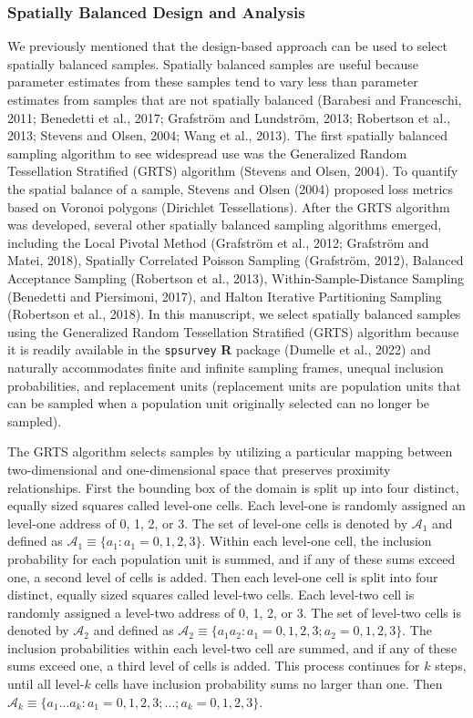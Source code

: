 \documentclass[]{elsarticle} %
\begin{document}
\hypertarget{subsec:spb_design}{%
\subsubsection{Spatially Balanced Design and
Analysis}\label{subsec:spb_design}}

We previously mentioned that the design-based approach can be used to
select spatially balanced samples. Spatially balanced samples are useful
because parameter estimates from these samples tend to vary less than
parameter estimates from samples that are not spatially balanced
(Barabesi and Franceschi, 2011; Benedetti et al., 2017; Grafström and
Lundström, 2013; Robertson et al., 2013; Stevens and Olsen, 2004; Wang
et al., 2013). The first spatially balanced sampling algorithm to see
widespread use was the Generalized Random Tessellation Stratified (GRTS)
algorithm (Stevens and Olsen, 2004). To quantify the spatial balance of
a sample, Stevens and Olsen (2004) proposed loss metrics based on
Voronoi polygons (Dirichlet Tessellations). After the GRTS algorithm was
developed, several other spatially balanced sampling algorithms emerged,
including the Local Pivotal Method (Grafström et al., 2012; Grafström
and Matei, 2018), Spatially Correlated Poisson Sampling (Grafström,
2012), Balanced Acceptance Sampling (Robertson et al., 2013),
Within-Sample-Distance Sampling (Benedetti and Piersimoni, 2017), and
Halton Iterative Partitioning Sampling (Robertson et al., 2018). In this
manuscript, we select spatially balanced samples using the Generalized
Random Tessellation Stratified (GRTS) algorithm because it is readily
available in the \texttt{spsurvey} \textbf{\textsf{R}} package (Dumelle
et al., 2022) and naturally accommodates finite and infinite sampling
frames, unequal inclusion probabilities, and replacement units
(replacement units are population units that can be sampled when a
population unit originally selected can no longer be sampled).

The GRTS algorithm selects samples by utilizing a particular mapping
between two-dimensional and one-dimensional space that preserves
proximity relationships. First the bounding box of the domain is split
up into four distinct, equally sized squares called level-one cells.
Each level-one is randomly assigned an level-one address of 0, 1, 2, or
3. The set of level-one cells is denoted by \(\mathcal{A}_1\) and
defined as \(\mathcal{A}_1 \equiv \{a_1: a_1 = 0, 1, 2, 3\}\). Within
each level-one cell, the inclusion probability for each population unit
is summed, and if any of these sums exceed one, a second level of cells
is added. Then each level-one cell is split into four distinct, equally
sized squares called level-two cells. Each level-two cell is randomly
assigned a level-two address of 0, 1, 2, or 3. The set of level-two
cells is denoted by \(\mathcal{A}_2\) and defined as
\(\mathcal{A}_2 \equiv \{a_1a_2: a_1 = 0, 1, 2, 3; a_2 = 0, 1, 2, 3\}\).
The inclusion probabilities within each level-two cell are summed, and
if any of these sums exceed one, a third level of cells is added. This
process continues for \(k\) steps, until all level-\(k\) cells have
inclusion probability sums no larger than one. Then
\(\mathcal{A}_k \equiv \{a_1...a_k : a_1 = 0, 1, 2, 3; ...; a_k = 0, 1, 2, 3\}\).
\end{document}
